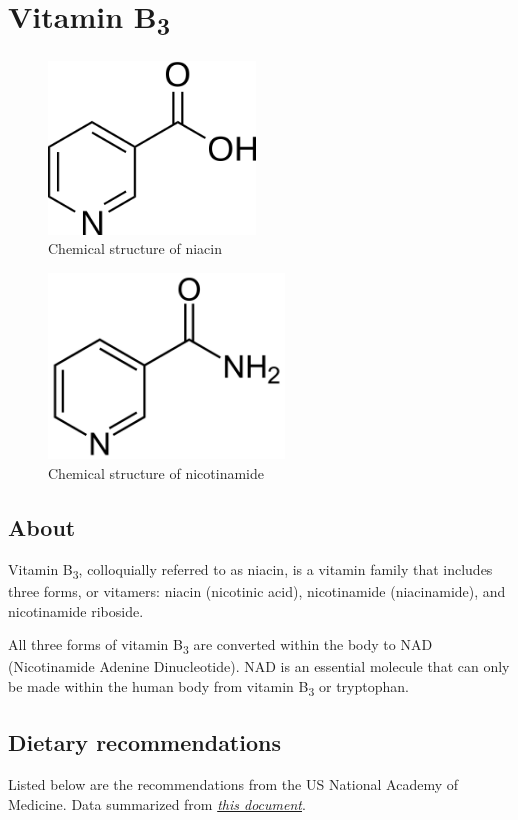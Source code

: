 \documentclass{book}
\begin{document}
\begin{sloppypar}
\chapter{Vitamin B\texorpdfstring{\textsubscript{3}}{3}}
\begin{figure}[h]
	\caption{Chemical structure of niacin}
	\centering \includegraphics[width=0.49\textwidth]{images/Vitamin_B3_chemical_structure_niacin}
\end{figure}
\begin{figure}[h]
	\caption{Chemical structure of nicotinamide}
	\centering \includegraphics[width=0.56\textwidth]{images/Vitamin_B3_chemical_structure_nicotinamide}
\end{figure}
\newpage

\section{About}
Vitamin B\textsubscript{3}, colloquially referred to as niacin, is a vitamin family that includes three forms, or vitamers: niacin (nicotinic acid), nicotinamide (niacinamide), and nicotinamide riboside.

All three forms of vitamin B\textsubscript{3} are converted within the body to NAD (Nicotinamide Adenine Dinucleotide). NAD is an essential molecule that can only be made within the human body from vitamin B\textsubscript{3} or tryptophan.

\section{Dietary recommendations}
Listed below are the recommendations from the US National Academy of Medicine. Data summarized from \href{https://nap.nationalacademies.org/read/6015/chapter/8}{\textit{this document}}.


\end{sloppypar}
\end{document}
